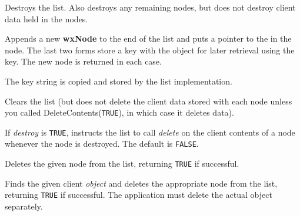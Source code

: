 Destroys the list.  Also destroys any remaining nodes, but does not destroy
client data held in the nodes.

\label{wxlistappend}




Appends a new {\bf wxNode} to the end of the list and puts a pointer to the
 in the node.  The last two forms store a key with the object for
later retrieval using the key. The new node is returned in each case.

The key string is copied and stored by the list implementation.

\label{wxlistclear}


Clears the list (but does not delete the client data stored with each node
unless you called DeleteContents({\tt TRUE}), in which case it deletes data).

\label{wxlistdeletecontents}


If {\it destroy} is {\tt TRUE}, instructs the list to call {\it delete} on the client contents of
a node whenever the node is destroyed. The default is {\tt FALSE}.

\label{wxlistdeletenode}


Deletes the given node from the list, returning {\tt TRUE} if successful.

\label{wxlistdeleteobject}


Finds the given client {\it object} and deletes the appropriate node from the list, returning
{\tt TRUE} if successful. The application must delete the actual object separately.

\label{wxlistfind}



